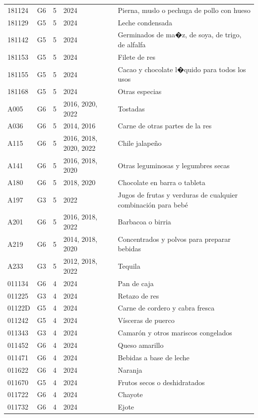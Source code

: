 \begin{table}[ht]
\begin{tabular}{llrll}
  181124 & G6 &   5 & 2024 & Pierna, muslo o pechuga de pollo con hueso \\ 
  181129 & G5 &   5 & 2024 & Leche condensada \\ 
  181142 & G5 &   5 & 2024 & Germinados de ma�z, de soya, de trigo, de alfalfa \\ 
  181153 & G5 &   5 & 2024 & Filete de res \\ 
  181155 & G5 &   5 & 2024 & Cacao y chocolate l�quido para todos los usos \\ 
  181168 & G5 &   5 & 2024 & Otras especias \\ 
  A005 & G6 &   5 & 2016, 2020, 2022 & Tostadas \\ 
  A036 & G6 &   5 & 2014, 2016 & Carne de otras partes de la res \\ 
  A115 & G6 &   5 & 2016, 2018, 2020, 2022 & Chile jalapeño \\ 
  A141 & G6 &   5 & 2016, 2018, 2020 & Otras leguminosas y legumbres secas \\ 
  A180 & G6 &   5 & 2018, 2020 & Chocolate en barra o tableta \\ 
  A197 & G3 &   5 & 2022 & Jugos de frutas y verduras de cualquier combinación para bebé \\ 
  A201 & G6 &   5 & 2016, 2018, 2022 & Barbacoa o birria \\ 
  A219 & G6 &   5 & 2014, 2018, 2020 & Concentrados y polvos para preparar bebidas \\ 
  A233 & G3 &   5 & 2012, 2018, 2022 & Tequila \\ 
  011134 & G6 &   4 & 2024 & Pan de caja \\ 
  011225 & G3 &   4 & 2024 & Retazo de res \\ 
  01122D & G5 &   4 & 2024 & Carne de cordero y cabra fresca \\ 
  011242 & G5 &   4 & 2024 & Vísceras de puerco \\ 
  011343 & G3 &   4 & 2024 & Camarón y otros mariscos congelados \\ 
  011452 & G6 &   4 & 2024 & Queso amarillo \\ 
  011471 & G6 &   4 & 2024 & Bebidas a base de leche \\ 
  011622 & G6 &   4 & 2024 & Naranja \\ 
  011670 & G5 &   4 & 2024 & Frutos secos o deshidratados \\ 
  011722 & G6 &   4 & 2024 & Chayote \\ 
  011732 & G6 &   4 & 2024 & Ejote \\ 

\end{tabular}
\end{table}
